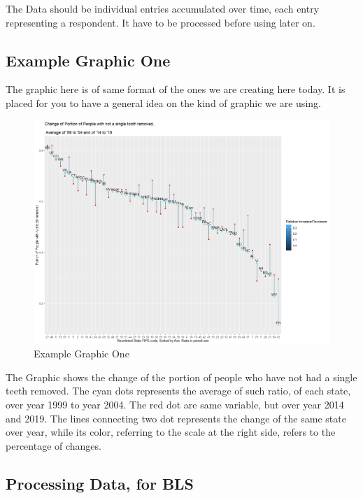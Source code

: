 \documentclass[
]{article}
\begin{document}
The Data should be individual entries accumulated over time, each entry
representing a respondent. It have to be processed before using later
on.

\hypertarget{example-graphic-one}{%
\subsection{Example Graphic One}\label{example-graphic-one}}

The graphic here is of same format of the ones we are creating here
today. It is placed for you to have a general idea on the kind of
graphic we are using.

\begin{figure}
\centering
\includegraphics{Change_By_State_01.png}
\caption{Example Graphic One}
\end{figure}

The Graphic shows the change of the portion of people who have not had a
single teeth removed. The cyan dots represents the average of such
ratio, of each state, over year 1999 to year 2004. The red dot are same
variable, but over year 2014 and 2019. The lines connecting two dot
represents the change of the same state over year, while its color,
referring to the scale at the right side, refers to the percentage of
changes.

\hypertarget{processing-data-for-bls}{%
\subsection{Processing Data, for BLS}\label{processing-data-for-bls}}
\end{document}
